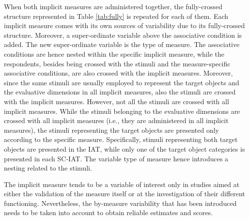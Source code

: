 \documentclass[12pt]{book}
\begin{document}
When both implicit measures are administered together, the fully-crossed structure represented in Table \ref{tab:fully} is repeated for each of them. 
Each implicit measure comes with its own sources of variability due to its fully-crossed structure.
Moreover, a super-ordinate variable above the associative condition is added. The new super-ordinate variable is the type of measure. 
The associative conditions are hence nested within the specific implicit measure, while the respondents, besides being crossed with the stimuli and the measure-specific associative conditions, are also crossed with the implicit measures. Moreover, since the same stimuli are usually employed to represent the target objects and the evaluative dimensions in all implicit measures, also the stimuli are crossed with the implicit measures.
However, not all the stimuli are crossed with all implicit measures. While the stimuli belonging to the evaluative dimensions are crossed with all implicit measures (i.e., they are administered in all implicit measures), the stimuli representing the target objects are presented only according to the specific measure. 
Specifically, stimuli representing both target objects are presented in the IAT, while only one of the target object categories is presented in each SC-IAT. The variable type of measure hence introduces a nesting related to the stimuli. 

The implicit measure tends to be a variable of interest only in studies aimed at either the validation of the measure itself or at the investigation of their different functioning.
Nevertheless, the by-measure variability that has been introduced needs to be taken into account to obtain reliable estimates and scores.

\end{document}

